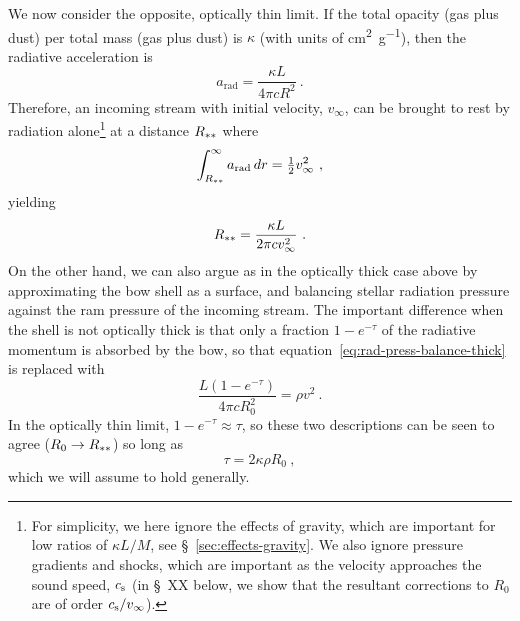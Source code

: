 We now consider the opposite, optically thin limit.  If the total
opacity (gas plus dust) per total mass (gas plus dust) is \(\kappa\) (with
units of \si{cm^2.g^{-1}}), then the radiative acceleration is
\begin{equation}
  \label{eq:rad-accel}
  a_{\text{rad}} = \frac{\kappa L}{4 \pi c R^2} \ .
\end{equation}
Therefore, an incoming stream with initial velocity, \(v_\infty\), can be
brought to rest by radiation alone\footnote{%
  For simplicity, we here ignore the effects of gravity, which are
  important for low ratios of \(\kappa L / M\), see
  \S~\ref{sec:effects-gravity}.  We also ignore pressure gradients and
  shocks, which are important as the velocity approaches the sound
  speed, \(c_{\text{s}}\) (in \S~XX below, we show that the resultant
  corrections to \(R_0\) are of order \(c_{\text{s}} / v_\infty\)).} %
at a distance \(R_{**}\) where
\begin{equation}
  \label{eq:rad-poten}
  \int_{R\starstar}^\infty a_{\text{rad}} \, dr = \tfrac12 v_\infty^2 \ , 
\end{equation}
yielding
\begin{equation}
  \label{eq:rad:R0}
  R_{**} = \frac{\kappa L}{2\pi c v_\infty^2} \ .
\end{equation}
On the other hand, we can also argue as in the optically thick case
above by approximating the bow shell as a surface, and balancing
stellar radiation pressure against the ram pressure of the incoming
stream.  The important difference when the shell is not optically
thick is that only a fraction \(1 - e^{-\tau}\) of the radiative momentum
is absorbed by the bow, so that
equation~\eqref{eq:rad-press-balance-thick} is replaced with
\begin{equation}
  \label{eq:rad-press-balance-tau}
  \frac{L (1 - e^{-\tau})}{4 \pi c R_0^2} = \rho v^2 \ .
\end{equation}
In the optically thin limit, \(1 - e^{-\tau} \approx \tau\), so these two
descriptions can be seen to agree (\(R_0 \to R_{**}\)) so long as
\begin{equation}
  \label{eq:tau-thin}
  \tau = 2 \kappa \rho R_0 \ ,
\end{equation}
which we will assume to hold generally.

